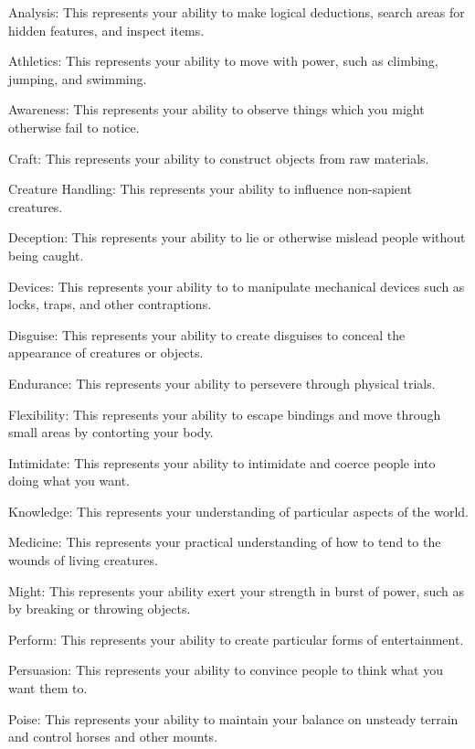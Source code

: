   \begin{raggeditemize}
    \item Analysis: This represents your ability to make logical deductions, search areas for hidden features, and inspect items.
    \item Athletics: This represents your ability to move with power, such as climbing, jumping, and swimming.
    \item Awareness: This represents your ability to observe things which you might otherwise fail to notice.
    \item Craft: This represents your ability to construct objects from raw materials.
    \item Creature Handling: This represents your ability to influence non-sapient creatures.
    \item Deception: This represents your ability to lie or otherwise mislead people without being caught.
    \item Devices: This represents your ability to to manipulate mechanical devices such as locks, traps, and other contraptions.
    \item Disguise: This represents your ability to create disguises to conceal the appearance of creatures or objects.
    \item Endurance: This represents your ability to persevere through physical trials.
    \item Flexibility: This represents your ability to escape bindings and move through small areas by contorting your body.
    \item Intimidate: This represents your ability to intimidate and coerce people into doing what you want.
    \item Knowledge: This represents your understanding of particular aspects of the world.
    \item Medicine: This represents your practical understanding of how to tend to the wounds of living creatures.
    \item Might: This represents your ability exert your strength in burst of power, such as by breaking or throwing objects.  
    \item Perform: This represents your ability to create particular forms of entertainment.
    \item Persuasion: This represents your ability to convince people to think what you want them to.
    \item Poise: This represents your ability to maintain your balance on unsteady terrain and control horses and other mounts.

\end{raggeditemize}
